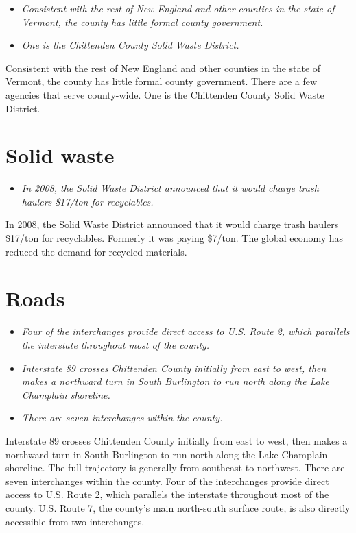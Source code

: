 \begin{itemize}
\item
  \emph{Consistent with the rest of New England and other counties in
  the state of Vermont, the county has little formal county government.}
\item
  \emph{One is the Chittenden County Solid Waste District.}
\end{itemize}

Consistent with the rest of New England and other counties in the state
of Vermont, the county has little formal county government. There are a
few agencies that serve county-wide. One is the Chittenden County Solid
Waste District.

\section{Solid waste}\label{solid-waste}

\begin{itemize}
\item
  \emph{In 2008, the Solid Waste District announced that it would charge
  trash haulers \$17/ton for recyclables.}
\end{itemize}

In 2008, the Solid Waste District announced that it would charge trash
haulers \$17/ton for recyclables. Formerly it was paying \$7/ton. The
global economy has reduced the demand for recycled materials.

\section{Roads}\label{roads}

\begin{itemize}
\item
  \emph{Four of the interchanges provide direct access to U.S. Route 2,
  which parallels the interstate throughout most of the county.}
\item
  \emph{Interstate 89 crosses Chittenden County initially from east to
  west, then makes a northward turn in South Burlington to run north
  along the Lake Champlain shoreline.}
\item
  \emph{There are seven interchanges within the county.}
\end{itemize}

Interstate 89 crosses Chittenden County initially from east to west,
then makes a northward turn in South Burlington to run north along the
Lake Champlain shoreline. The full trajectory is generally from
southeast to northwest. There are seven interchanges within the county.
Four of the interchanges provide direct access to U.S. Route 2, which
parallels the interstate throughout most of the county. U.S. Route 7,
the county's main north-south surface route, is also directly accessible
from two interchanges.

